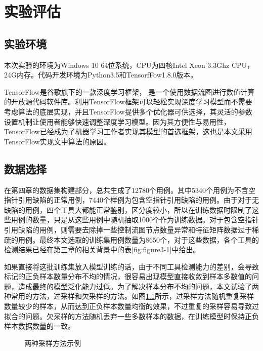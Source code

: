 \chapter{实验评估}
\section{实验环境}
本次实验的环境为Windows 10 64位系统，CPU为四核Intel Xeon 3.3Ghz CPU，24G内存。代码开发环境为Python3.5和TensorfFow1.8.0版本。

TensorFlow是谷歌旗下的一款深度学习框架， 是一个使用数据流图进行数值计算的开放源代码软件库。利用TensorFlow框架可以轻松实现深度学习模型而不需要考虑算法的底层实现，并且TensorFlow提供多个优化器可供选择，其灵活的参数设置机制让使用者能够快速调整深度学习模型。因为其方便性与易用性，TensorFlow已经成为了机器学习工作者实现其模型的首选框架，这也是本文采用TensorFlow实现文中算法的原因。

\section{数据选择}

在第四章的数据集构建部分，总共生成了12780个用例。其中5340个用例为不含空指针引用缺陷的正常用例，7440个样例为包含空指针引用缺陷的用例。由于对于无缺陷的用例，四个工具大都能正常鉴别，区分度较小，所以在训练数据时限制了这些用例的数量，只是从这些用例中随机抽取1000个作为训练数据。对于包含空指针引用缺陷的用例，则需要去除掉一些控制流图节点数量异常和特征矩阵数据过于稀疏的用例。最终本文选取的训练集用例数量为8650个，对于这些数据，各个工具的检测结果已经在第三章的相关背景中的表\ref{fig:figure3-1}中给出。

如果直接将这批训练集放入模型训练的话，由于不同工具检测能力的差别，会导致标记的正负样本数量分布不均的情况，很容易出现模型直接收敛到样本多数值的问题，造成最终的模型泛化能力过低。为了解决样本分布不均的问题，本文试验了两种常用的方法，过采样和欠采样的方法。如图\ref{fig:caiyang}所示，过采样方法随机重复采样数量较少的样本，从而达到正负样本数量均衡的效果，不过重复的采样容易导致过拟合的问题。欠采样的方法随机丢弃一些多数样本的数据，在训练模型时保持正负样本数据数量的一致。

\begin{figure}[h]
	\label{fig:caiyang}
	\centering
	\caption{两种采样方法示例}
\end{figure}

